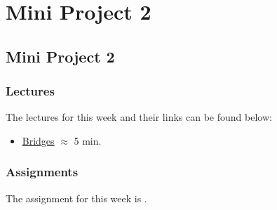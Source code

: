 \clearpage

\renewcommand{\ChapTitle}{Mini Project 2}
\renewcommand{\SectionTitle}{Mini Project 2}

\chapter{\ChapTitle}
\section{\SectionTitle}

\subsection{Lectures}

The lectures for this week and their links can be found below:

\begin{itemize}
    \item \href{https://www.youtube.com/watch?v=nZwSo4vfw6c}{Bridges} $\approx$ 5 min.
\end{itemize}

\subsection{Assignments}

The assignment for this week is .  